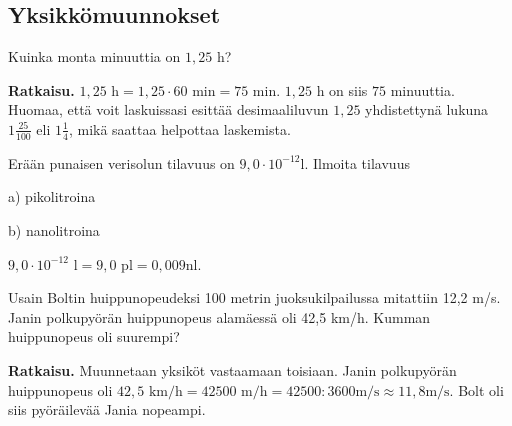 
\subsection*{Yksikkömuunnokset}



\begin{esimerkki}
Kuinka monta minuuttia on $1,25$ h?

\textbf{Ratkaisu. }
$1,25 \text{ h} = 1,25 \cdot 60 \text{ min} = 75 \text{ min}$. $1,25$ h on siis $75$ minuuttia. Huomaa, että voit laskuissasi esittää desimaaliluvun $1,25$ yhdistettynä lukuna $1 \frac{25}{100}$ eli $1 \frac{1}{4}$, mikä saattaa helpottaa laskemista.
\end{esimerkki}

\begin{esimerkki}
Erään punaisen verisolun tilavuus on $9,0 \cdot 10^{-12} \textrm{l}$. Ilmoita tilavuus

a) pikolitroina

b) nanolitroina

\begin{esimratk}
$9,0 \cdot 10^{-12} \textrm{ l} = 9,0 \textrm{ pl} = 0,009 \textrm{nl}$.
\end{esimratk}
\end{esimerkki}

\begin{esimerkki}
Usain Boltin huippunopeudeksi 100 metrin juoksukilpailussa mitattiin 12,2 m/s. Janin polkupyörän huippunopeus alamäessä oli 42,5 km/h. Kumman huippunopeus oli suurempi?

\textbf{Ratkaisu.}
Muunnetaan yksiköt vastaamaan toisiaan. Janin polkupyörän huippunopeus oli $42,5 \textrm{ km/h} = 42500 \textrm{ m/h} = 42500 : 3600 \textrm{m/s} \approx 11,8 \textrm{m/s}$.
Bolt oli siis pyöräilevää Jania nopeampi.
\end{esimerkki}

